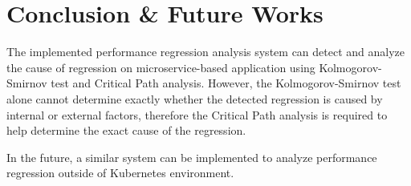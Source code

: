 \documentclass[conference]{configs/IEEEtran}
\begin{document}
\section{Conclusion \& Future Works}
The implemented performance regression analysis system can detect and analyze the cause of regression on microservice-based application using Kolmogorov-Smirnov test and Critical Path analysis. However, the Kolmogorov-Smirnov test alone cannot determine exactly whether the detected regression is caused by internal or external factors, therefore the Critical Path analysis is required to help determine the exact cause of the regression.

In the future, a similar system can be implemented to analyze performance regression outside of Kubernetes environment.

%




\vspace{12pt}
\end{document}
